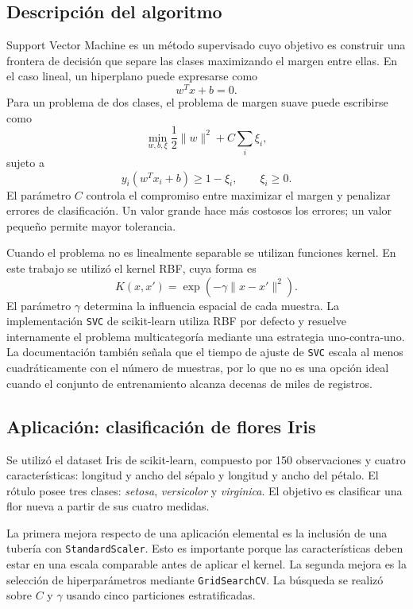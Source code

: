 \documentclass[14pt,twoside]{article}
\begin{document}
\subsection{Descripción del algoritmo}

Support Vector Machine es un método supervisado cuyo objetivo es construir una frontera de decisión que separe las clases maximizando el margen entre ellas. En el caso lineal, un hiperplano puede expresarse como
\[
w^T x+b=0.
\]
Para un problema de dos clases, el problema de margen suave puede escribirse como
\[
\min_{w,b,\xi}\frac{1}{2}\lVert w\rVert^2+C\sum_i\xi_i,
\]
sujeto a
\[
y_i(w^Tx_i+b)\ge 1-\xi_i,\qquad \xi_i\ge0.
\]
El parámetro $C$ controla el compromiso entre maximizar el margen y penalizar errores de clasificación. Un valor grande hace más costosos los errores; un valor pequeño permite mayor tolerancia.

Cuando el problema no es linealmente separable se utilizan funciones kernel. En este trabajo se utilizó el kernel RBF, cuya forma es
\[
K(x,x')=\exp\left(-\gamma\lVert x-x'\rVert^2\right).
\]
El parámetro $\gamma$ determina la influencia espacial de cada muestra. La implementación \texttt{SVC} de scikit-learn utiliza RBF por defecto y resuelve internamente el problema multicategoría mediante una estrategia uno-contra-uno. La documentación también señala que el tiempo de ajuste de \texttt{SVC} escala al menos cuadráticamente con el número de muestras, por lo que no es una opción ideal cuando el conjunto de entrenamiento alcanza decenas de miles de registros. \cite{sklearnSVC}

\subsection{Aplicación: clasificación de flores Iris}

Se utilizó el dataset Iris de scikit-learn, compuesto por 150 observaciones y cuatro características: longitud y ancho del sépalo y longitud y ancho del pétalo. El rótulo posee tres clases: \textit{setosa}, \textit{versicolor} y \textit{virginica}. El objetivo es clasificar una flor nueva a partir de sus cuatro medidas.

La primera mejora respecto de una aplicación elemental es la inclusión de una tubería con \texttt{StandardScaler}. Esto es importante porque las características deben estar en una escala comparable antes de aplicar el kernel. La segunda mejora es la selección de hiperparámetros mediante \texttt{GridSearchCV}. La búsqueda se realizó sobre $C$ y $\gamma$ usando cinco particiones estratificadas.
\end{document}
